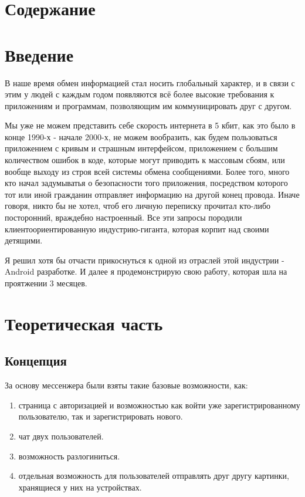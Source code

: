 \documentclass[utf8,14pt,a4paper,oneside,russian]{book}
\makeatletter
\renewcommand{\tableofcontents}{\section*{Содержание}\markboth{Содержание}{}\@starttoc{toc}\newpage}
\makeatother
\begin{document}
	\tableofcontents
	
	\section{Введение}
	В наше время обмен информацией стал носить глобальный характер, и в связи с этим у людей с каждым годом появляются всё более высокие требования к приложениям и программам, позволяющим им коммуницировать друг с другом.
	
	Мы уже не можем представить себе скорость интернета в 5 кбит, как это было в конце 1990-х - начале 2000-х, не можем вообразить, как будем пользоваться приложением с кривым и страшным интерфейсом, приложением с большим количеством ошибок в коде, которые могут приводить к массовым сбоям, или вообще выходу из строя всей системы обмена сообщениями. Более того, много кто начал задумыватья о безопасности того приложения, посредством которого тот или иной гражданин отправляет информацию на другой конец провода. Иначе говоря, никто бы не хотел, чтоб его личную переписку прочитал кто-либо посторонний, враждебно настроенный. Все эти запросы породили клиентоориентированную индустрию-гиганта, которая корпит над своими детящими. 
	
	Я решил хотя бы отчасти прикоснуться к одной из отраслей этой индустрии - Android разработке. И далее я продемонстрирую свою работу, которая шла на проятжении 3 месяцев.
	\newpage
	
	\section{Теоретическая часть}
	\subsection{Концепция}
	За основу мессенжера были взяты такие базовые возможности, как:
	
	\begin{enumerate}
		\item страница с авторизацией и возможностью как войти уже зарегистрированному пользователю, так и зарегистрировать нового.
		\item чат двух пользователей.
		\item возможность разлогиниться.
		\item отдельная возможность для пользователей отправлять друг другу картинки, хранящиеся у них на устройствах.
	\end{enumerate}
	
\end{document}
